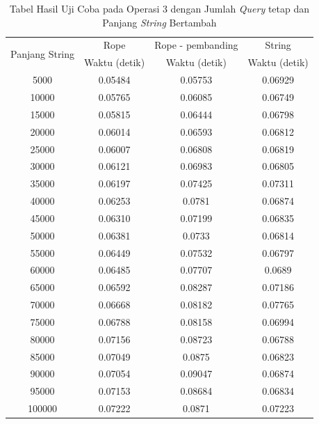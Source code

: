 \begin{appendices}
  \begin{table}[h]
  \centering
	 \begin{tabular}{|c|c|c|c|}
		  \hline
		  \multirow{2}{*}{Panjang String} & Rope & Rope - pembanding & String\\
		  		  & Waktu (detik) & Waktu (detik) & Waktu (detik)\\ \hline
		  5000	& 0.05484	& 0.05753	& 0.06929\\ \hline
		  10000	& 0.05765	& 0.06085	& 0.06749\\ \hline
		  15000	& 0.05815	& 0.06444	& 0.06798\\ \hline
		  20000	& 0.06014	& 0.06593	& 0.06812\\ \hline
		  25000	& 0.06007	& 0.06808	& 0.06819\\ \hline
		  30000	& 0.06121	& 0.06983	& 0.06805\\ \hline
		  35000	& 0.06197	& 0.07425	& 0.07311\\ \hline
		  40000	& 0.06253	& 0.0781	& 0.06874\\ \hline
		  45000	& 0.06310	& 0.07199	& 0.06835\\ \hline
		  50000	& 0.06381	& 0.0733	& 0.06814\\ \hline
		  55000	& 0.06449	& 0.07532	& 0.06797\\ \hline
		  60000	& 0.06485	& 0.07707	& 0.0689\\ \hline
		  65000	& 0.06592	& 0.08287	& 0.07186\\ \hline
		  70000	& 0.06668	& 0.08182	& 0.07765\\ \hline
		  75000	& 0.06788	& 0.08158	& 0.06994\\ \hline
		  80000	& 0.07156	& 0.08723	& 0.06788\\ \hline
		  85000	& 0.07049	& 0.0875	& 0.06823\\ \hline
		  90000	& 0.07054	& 0.09047	& 0.06874\\ \hline
		  95000	& 0.07153	& 0.08684	& 0.06834\\ \hline
		  100000	& 0.07222	& 0.0871	& 0.07223\\ \hline
	  \end{tabular}\caption{Tabel Hasil Uji Coba pada Operasi 3 dengan Jumlah \textit{Query} tetap dan Panjang \textit{String} Bertambah}
	  \label{tab:operasi3string}
  \end{table}
  

\end{appendices}
